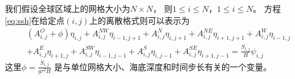 我们假设全球区域上的网格大小为$N\times N$， 则$1\le i\le N$，$1\le i\le N$。  
方程\ref{eq:ssh}在给定点$(i,j)$上的离散格式则可以表示为  
\begin{align}
\label{eq:sten}
&(A_{i,j}^O+\phi ) \eta_{i,j}+A_{i,j}^{NW}\eta_{i-1,j+1}+A_{i,j}^N\eta_{i,j+1} +A_{i,j}^{NE}\eta_{i+1,j+1}+A_{i,j}^W\eta_{i-1,j}  \nonumber\\
& +A_{i,j}^E\eta_{i+1,j} +A_{i,j}^{SW}\eta_{i-1,j-1} +A_{i,j}^S\eta_{i,j-1}+ A_{i,j }^{SE}\eta_{i+1,j-1}= \frac{S_{i,j}}{H}\psi_{i,j}
\end{align}
这里$\phi = \frac{S_{i,j}}{g  \tau^2H}$ 是与单位网格大小、海底深度和时间步长有关的一个变量。

